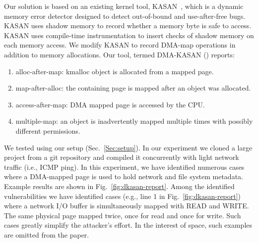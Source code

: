 Our solution is based on an existing kernel tool, KASAN~\cite{kasan}, which is a dynamic memory error detector designed to detect out-of-bound and use-after-free bugs. KASAN uses shadow memory to record whether a memory byte is safe to access. KASAN uses compile-time instrumentation to insert checks of shadow memory on each memory access. 
We modify KASAN to record DMA-map operations in addition to memory allocations. Our tool, termed DMA-KASAN (\dkasan) reports: 
\begin{enumerate}
    \item alloc-after-map:  kmalloc object is allocated from a mapped page.
    \item map-after-alloc:  the containing page is mapped after an object was allocated.
    \item access-after-map: DMA mapped page is accessed by the CPU.
    \item multiple-map: an object is inadvertently mapped multiple times with possibly different permissions.
\end{enumerate}
We tested \dkasan using our setup (Sec.~\ref{Sec:setup}). In our experiment we cloned a large project from a git repository and compiled it concurrently with light network traffic (i.e., ICMP ping). In this experiment, we have identified numerous cases where a DMA-mapped page is used to hold network and file system metadata. Example results are shown in Fig.~\ref{fig:dkasan-report}. 
Among the identified vulnerabilities we have identified cases (e.g., line 1 in Fig.~\ref{fig:dkasan-report}) where a network I/O buffer is simultaneously mapped with READ and WRITE. The same physical page mapped twice, once for read and once for write. Such cases greatly simplify the attacker's effort. In the interest of space, such examples are omitted from the paper. 

